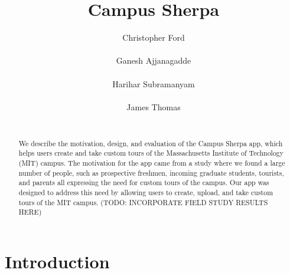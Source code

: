 \documentclass{sigchi}
\begin{document}
\title{Campus Sherpa}

\author{
  \alignauthor Christopher Ford\\
    \\
  \alignauthor Ganesh Ajjanagadde\\
    \\
  \alignauthor Harihar Subramanyam\\
    \\
   \alignauthor James Thomas\\
    \\
}

\maketitle

\begin{abstract}
We describe the motivation, design, and evaluation of the Campus Sherpa app, which helps users create and take custom tours of the Massachusetts Institute of Technology (MIT) campus. The motivation for the app came from a study where we found a large number of people, such as prospective freshmen, incoming graduate students, tourists, and parents all expressing the need for custom tours of the campus. Our app was designed to address this need by allowing users to create, upload, and take custom tours of the MIT campus. (TODO: INCORPORATE FIELD STUDY RESULTS HERE)

\end{abstract}

%
%

\section{Introduction}
\end{document}
